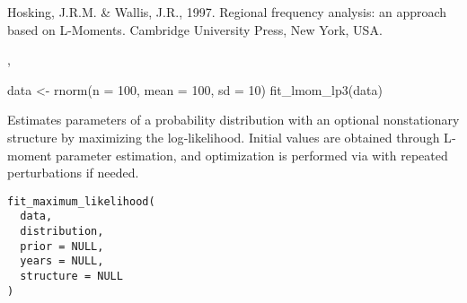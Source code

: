 \documentclass[a4paper]{book}
\begin{document}
%
\begin{References}
Hosking, J.R.M. \& Wallis, J.R., 1997. Regional frequency analysis: an approach based
on L-Moments. Cambridge University Press, New York, USA.
\end{References}
%
\begin{SeeAlso}
, 
\end{SeeAlso}
%
\begin{Examples}
\begin{ExampleCode}
data <- rnorm(n = 100, mean = 100, sd = 10)
fit_lmom_lp3(data)

\end{ExampleCode}
\end{Examples}
%
\begin{Description}
Estimates parameters of a probability distribution with an optional nonstationary
structure by  maximizing the log‐likelihood. Initial values are obtained through
L‐moment parameter estimation, and optimization is performed via 
with repeated perturbations if needed.
\end{Description}
%
\begin{Usage}
\begin{verbatim}
fit_maximum_likelihood(
  data,
  distribution,
  prior = NULL,
  years = NULL,
  structure = NULL
)
\end{verbatim}
\end{Usage}
%
\end{document}
